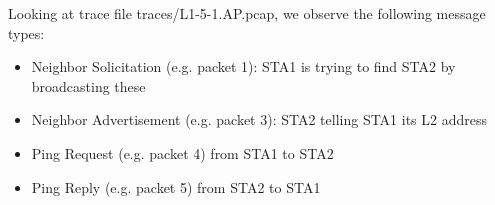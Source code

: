 Looking at trace file traces/L1-5-1.AP.pcap, we observe the following message types:
\begin{itemize}
\item Neighbor Solicitation (e.g. packet 1):  STA1 is trying to find STA2 by broadcasting these
\item Neighbor Advertisement (e.g. packet 3): STA2 telling STA1 its L2 address
\item Ping Request (e.g. packet 4) from STA1 to STA2
\item Ping Reply (e.g. packet 5) from STA2 to STA1
\end{itemize}
